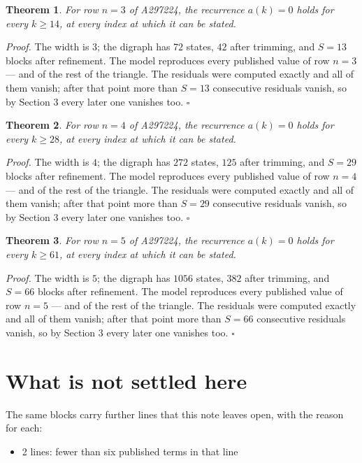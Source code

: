\documentclass[11pt]{article}
\newtheorem{theorem}{Theorem}
\theoremstyle{definition}
\begin{document}
\begin{theorem} For row $n = 3$ of A297224, the recurrence $a(k) = 0$ holds for every $k \ge 14$, at every index at which it can be stated.\end{theorem}

{\itshape Proof.} The width is $3$; the digraph has $72$ states, $42$ after trimming, and $S = 13$ blocks after refinement. The model reproduces every published value of row $n = 3$ --- and of the rest of the triangle. The residuals were computed exactly and all of them vanish; after that point more than $S = 13$ consecutive residuals vanish, so by Section 3 every later one vanishes too. $\square$

\begin{theorem} For row $n = 4$ of A297224, the recurrence $a(k) = 0$ holds for every $k \ge 28$, at every index at which it can be stated.\end{theorem}

{\itshape Proof.} The width is $4$; the digraph has $272$ states, $125$ after trimming, and $S = 29$ blocks after refinement. The model reproduces every published value of row $n = 4$ --- and of the rest of the triangle. The residuals were computed exactly and all of them vanish; after that point more than $S = 29$ consecutive residuals vanish, so by Section 3 every later one vanishes too. $\square$

\begin{theorem} For row $n = 5$ of A297224, the recurrence $a(k) = 0$ holds for every $k \ge 61$, at every index at which it can be stated.\end{theorem}

{\itshape Proof.} The width is $5$; the digraph has $1056$ states, $382$ after trimming, and $S = 66$ blocks after refinement. The model reproduces every published value of row $n = 5$ --- and of the rest of the triangle. The residuals were computed exactly and all of them vanish; after that point more than $S = 66$ consecutive residuals vanish, so by Section 3 every later one vanishes too. $\square$

\section{What is not settled here}

The same blocks carry further lines that this note leaves open, with the reason for each:

\begin{itemize}

\item 2 lines: fewer than six published terms in that line

\end{itemize}
\end{document}
